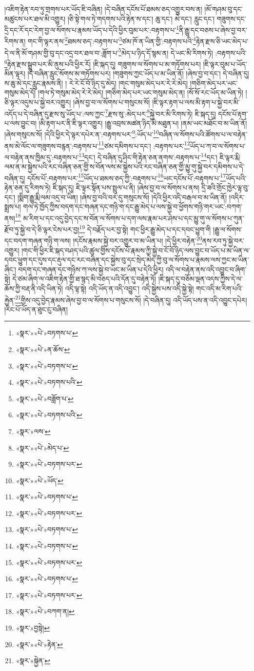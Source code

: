 །འཇིག་རྟེན་རབ་ཏུ་གྲགས་པར་ཡོད་ཇི་བཞིན། །དེ་བཞིན་དངོས་པོ་ཐམས་ཅད་འགྱུར་བས་ན། །མོ་གཤམ་བུ་དང་མཚུངས་པར་ཐལ་མི་འགྱུར། །ཅི་སྟེ་གལ་ཏེ་གདགས་པའི་རྟེན་ས་དང་། ཆུ་དང་། མེ་དང་། རླུང་དང་། གཟུགས་དང་དྲི་དང་རོ་དང་རེག་བྱ་ལ་སོགས་པ་རྣམས་ཡོད་པ་དེའི་ཕྱིར་བུམ་པར་:བརྟགས་པ་\footnote{«སྣར་»«པེ་»བཏགས་པ་}ནི་རྒྱུ་དང་བཅས་པ་ཞེས་བྱ་བར་རིགས་ན། གང་གི་ལྟར་ནས་\footnote{«སྣར་»«པེ་»ན་ཆོས་}ཐམས་ཅད་:བརྟགས་པ་\footnote{«སྣར་»«པེ་»བཏགས་པ་}ཙམ་ཁོ་ན་ཡིན་གྱི་:བརྟགས་པའི་\footnote{«སྣར་»«པེ་»བཏགས་པའི་}རྟེན་རྫས་ཅི་ཡང་མེད་པ་དེ་ལ་ནི་མོ་གཤམ་གྱི་བུ་དང་འདྲ་བར་ཐལ་བ་:ཟློག་པ་\footnote{«སྣར་»«པེ་»བཟློག་པ་}མེད་པ་ཉིད་དོ་སྙམ་ན། དེ་ཡང་མི་རིགས་ཏེ། :བརྟགས་པའི་\footnote{«སྣར་»«པེ་»བཏགས་པའི་}རྟེན་རྫས་སྒྲུབ་པར་མི་ནུས་པའི་ཕྱིར་རོ། །ཇི་སྐད་དུ། གཟུགས་ལ་སོགས་པ་མ་གཏོགས་པར། །ཇི་ལྟར་བུམ་པ་ཡོད་མིན་ལྟར། །དེ་བཞིན་རླུང་སོགས་མ་གཏོགས་པར། །གཟུགས་ཀྱང་ཡོད་པ་མ་ཡིན་ནོ། །ཞེས་བྱ་བ་དང་། དེ་བཞིན་དུ། ས་ཆུ་མེ་དང་རླུང་རྣམས་ནི། །
རེ་རེ་ངོ་བོ་ཉིད་དུ་མེད། །གང་གསུམ་མེད་པར་རེ་རེ་མེད། །གཅིག་མེད་པར་ཡང་གསུམ་མེད་དོ། །གལ་ཏེ་གསུམ་མེད་རེ་རེ་མེད། །གཅིག་མེད་པར་ཡང་གསུམ་མེད་ན། །སོ་སོ་རང་ཡོད་མ་ཡིན་ཏེ། །ཅི་ལྟར་འདུས་པ་སྐྱེ་བར་འགྱུར། །ཞེས་བྱ་བ་ལ་སོགས་པ་གསུངས་སོ། །ཇི་ལྟར་རྟག་པ་ལས་མི་རྟག་པ་སྐྱེ་བར་མི་འདོད་པ་དེ་བཞིན་དུ་རྫས་སུ་ཡོད་པ་:ལས་ཀྱང་\footnote{«སྣར་»ལས་}རྫས་སུ་:མེད་པར་\footnote{«སྣར་»«པེ་»མེད་པ་}སྐྱེ་བར་མི་རིགས་ཏེ། ཇི་སྐད་དུ། དངོས་པོ་རྟག་པ་ལས་བྱུང་བ། །མི་རྟག་པར་ནི་ཇི་ལྟར་འགྱུར། །རྒྱུ་འབྲས་མཚན་ཉིད་མི་མཐུན་པ། །ནམ་ཡང་མཐོང་བ་མ་ཡིན་ནོ། །ཞེས་གསུངས་སོ། །དེའི་ཕྱིར་དེ་ལྟར་དཔེར་ན་:བརྟགས་པར་\footnote{«སྣར་»«པེ་»བཏགས་པར་}:ཡོད་པ་\footnote{«སྣར་»«པེ་»ཡོད་}བཞིན་ལ་སོགས་པའི་ཚོགས་པ་ལ་བརྟེན་ནས་མེ་ལོང་ལ་གཟུགས་བརྙན་:བརྟགས་པ་\footnote{«སྣར་»«པེ་»བཏགས་པ་}ཙམ་དམིགས་པ་དང་། :བརྟགས་པར་\footnote{«སྣར་»«པེ་»བཏགས་པར་}ཡོད་པ་ཀ་བ་ལ་སོགས་པ་ལ་བརྟེན་ནས་ཁྱིམ་དུ་:བརྟགས་པ་\footnote{«སྣར་»«པེ་»བཏགས་པ་}དང་། དེ་བཞིན་དུ་ཤིང་གི་རྟེན་ཅན་ནགས་:བརྟགས་པ་\footnote{«སྣར་»«པེ་»བཏགས་པ་}དང་། ཇི་ལྟར་རྨི་ལམ་ན་མ་སྐྱེས་པའི་རང་བཞིན་ཅན་གྱི་ས་བོན་ལས་མ་སྐྱེས་པའི་རང་བཞིན་ཅན་གྱི་མྱུ་གུ་སྐྱེ་བར་དམིགས་པ་དེ་བཞིན་དུ། དངོས་པོ་:བརྟགས་པར་\footnote{«སྣར་»«པེ་»བཏགས་པར་}ཡོད་པ་ཐམས་ཅད་ཀྱི་:བརྟགས་པ་\footnote{«སྣར་»«པེ་»བཏགས་པ་}ཡང་དངོས་པོ་:བརྟགས་པ་\footnote{«སྣར་»«པེ་»བཏགས་པར་}ཡོད་པའི་རྟེན་ཅན་དུ་རིགས་ཏེ། ཇི་སྐད་དུ། ཇི་ལྟར་སྟོན་པས་སྤྲུལ་པ་ནི། །ཞེས་བྱ་བ་ལ་སོགས་པ་ནས། དྲི་ཟའི་གྲོང་ཁྱེར་ལྟ་བུ་དང་། །སྨིག་རྒྱུ་རྨི་ལམ་འདྲ་བ་ཡིན། །ཞེས་བྱ་བའི་བར་དུ་གསུངས་སོ། །དེའི་ཕྱིར་འདི་བརྒལ་བ་མ་ཡིན་ནོ། །འདིར་སྨྲས་པ། གལ་ཏེ་ཁྱོད་ཀྱིས་བདག་དང་གཞན་དང་གཉི་ག་དང་རྒྱུ་མེད་པ་ལས་སྐྱེ་བ་ཕྱོགས་གཉི་གར་ཡང་:བཀག་ནས།\footnote{«སྣར་»«པེ་»བཀག་ན།} མ་རིག་པ་དང་འདུ་བྱེད་དང་ས་བོན་ལ་སོགས་པ་དག་ལས་རྣམ་པར་ཤེས་པ་དང་མྱུ་གུ་ལ་སོགས་པ་ཀུན་རྫོབ་ཏུ་སྐྱེ་བ་དེ་ཅི་ལྟར་ངེས་པར་བྱ།\footnote{«སྣར་»བྱསྟེ།} དེ་བརྗོད་པར་བྱ་སྟེ། གང་ཕྱིར་རྒྱུ་མེད་པ་དང་དབང་ཕྱུག་གི །རྒྱུ་ལ་སོགས་དང་བདག་གཞན་གཉི་ག་ལས། །དངོས་རྣམས་སྐྱེ་བར་འགྱུར་བ་མ་ཡིན་པ། །དེ་ཕྱིར་བརྟེན་\footnote{«སྣར་»«པེ་»རྟེན་}ནས་རབ་ཏུ་སྐྱེ་བར་འགྱུར། །གང་གི་ཕྱིར་ཇི་སྐད་བཤད་པའི་ཚུལ་གྱིས་དངོས་པོ་རྣམས་ཀྱི་སྐྱེ་བ་ངོ་བོ་ཉིད་ལས་བྱུང་བ་ཡོད་པ་མ་ཡིན་ལ་དབང་ཕྱུག་དང་དུས་དང་རྡུལ་དང་རང་བཞིན་དང་སྐྱེས་བུ་དང་སྲེད་མེད་ཀྱི་བུ་ལ་སོགས་པ་རྣམས་ལས་ཀྱང་མ་ཡིན་ཞིང་། བདག་དང་གཞན་དང་གཉིས་ཀ་ལས་སྐྱེ་བ་ཡང་མ་ཡིན་པ་དེའི་ཕྱིར། འདི་ལ་བརྟེན་ནས་འདི་འབྱུང་བ་ཞིག་སྟེ། དེ་ཙམ་ཞིག་ལ་འཇིག་རྟེན་གྱི་ཐ་སྙད་མི་བཅད་པའི་དོན་དུ་བརྟེན་ཏོ། །ཇི་སྐད་དུ་བཅོམ་ལྡན་འདས་ཀྱིས་དེ་ལ་ཆོས་ཀྱི་བརྡ་ནི་འདི་ཡིན་ཏེ། འདི་ལྟ་སྟེ། འདི་ཡོད་ན་འདི་འབྱུང་། འདི་སྐྱེས་པས་འདི་སྐྱེ་སྟེ། གང་འདི་མ་རིག་པའི་རྐྱེན་\footnote{«སྣར་»སྐྱེན་}གྱིས་འདུ་བྱེད་རྣམས་ཞེས་བྱ་བ་ལ་སོགས་པ་གསུངས་སོ། །དེ་བཞིན་དུ། འདི་ཡོད་པས་ན་འདི་འབྱུང་དཔེར། །རིང་པོ་ཡོད་ན་ཐུང་ངུ་བཞིན། 